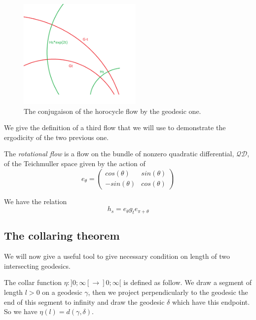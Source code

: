 \begin{figure}[h!]
\centering
\includegraphics[width=6cm]{Image/Commutatoin.png}
\caption{The conjugaison of the horocycle flow by the geodesic one.}
\end{figure}


We give the definition of a third flow that we will use to demonstrate the ergodicity of the two previous one.

\begin{dfnt}
The \emph{rotational flow} is a flow on the bundle of nonzero quadratic differential, $\mathcal{QD}$, of the Teichmuller space given by the action of \[
e_{\theta}=\begin{pmatrix}
cos(\theta) & sin(\theta) \\
-sin(\theta) & cos(\theta)
\end{pmatrix}
\]
\end{dfnt}

We have the relation \[
h_s=e_{\theta}g_t e_{\pi+\theta}
\]

\subsection{The collaring theorem}

We will now give a useful tool to give necessary condition on length of two intersecting geodesics.

The collar function $\eta:]0; \infty[ \to ]0;\infty[$ is defined as follow. We draw a segment of length $l > 0$ on a geodesic $\gamma$, then we project perpendicularly to the geodesic the end of this segment to infinity and draw the geodesic $\delta$ which have this endpoint. So we have $\eta(l)=d(\gamma,\delta)$.


